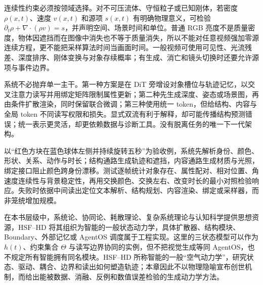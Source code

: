 连续性约束必须按领域选择。对不可压流体、守恒粒子或已知刚体，若密度 $\rho(x,t)$、速度 $v(x,t)$ 和源项 $s(x,t)$ 有明确物理意义，可检验 $\partial_t\rho+\nabla\cdot(\rho v)=s$，并声明空间、场景时间和单位。普通 RGB 亮度不是质量密度，物体因遮挡而在图像中消失也不等于质量消失，所以不能对任意视频强加零源连续方程，更不能把采样算法时间当画面时间。一般视频可使用可见性、光流残差、深度排序、刚体变换与对象存续概率；有生成、消亡和镜头切换时还要允许源项与事件边界。

系统不必抛弃单一主干。第一种方案是在 DiT 旁增设对象槽位与轨迹记忆，以交叉注意力读写并用绑定矩阵限制属性更新；第二种先生成深度、姿态或场景图，再由条件扩散渲染，同时保留联合微调；第三种使用统一 token，但给结构、内容与全局 token 不同读写权限和损失。显式双流有利于解释，却可能传播结构预测错误；统一表示更灵活，却更依赖数据与诊断工具。没有脱离任务的唯一下一代架构。

以“红色方块在蓝色球体左侧并持续旋转五秒”为验收例，系统先解析身份、颜色、形状、关系、动作与时长；结构通路生成轨迹和遮挡，内容通路生成材质与光照，绑定接口阻止颜色跨身份漂移。测试逐帧统计对象存在、属性配对、相对位置、角速度连续性与背景稳定性，再用交换颜色、交换左右、改变时长的最小对照检验响应。失败时依据中间读出定位文本解析、结构规划、内容渲染、绑定或采样器，而非笼统增加规模。

在本书层级中，系统论、协同论、耗散理论、复杂系统理论与认知科学提供思想资源，HSF--HD 将其组织为智能的一般状态动力学，具体扩散器、结构模块、Boundary、外部记忆或 AgentOS 调度属于工程实现。这里的三状态模型可以作为 $h(t)$、约束集合 $\Theta$ 与读写边界协同的实例，但不把视觉生成等同 AgentOS，也不规定所有智能拥有同名模块。HSF--HD 所称智能的一般“空气动力学”，研究状态、驱动、耦合、边界和读出如何塑造轨迹；本章因此不以物理隐喻宣布创世机制，而给出能被数据、消融、反例和数值误差检验的生成动力学方法。

